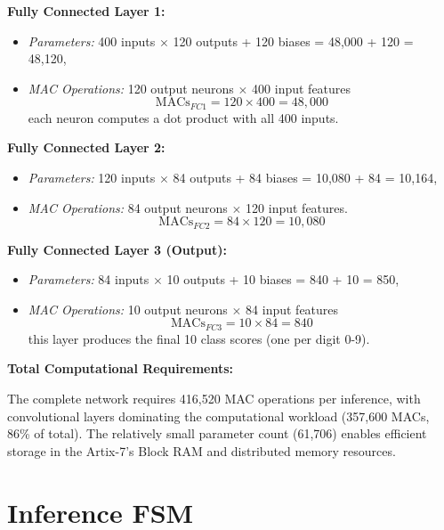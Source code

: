 \documentclass[12pt,a4paper]{report}
\begin{document}
\textbf{Fully Connected Layer 1:}
\begin{itemize}
    \item \textit{Parameters:} 400 inputs $\times$ 120 outputs + 120 biases = 48,000 + 120 = 48,120,
    \item \textit{MAC Operations:} 120 output neurons $\times$ 400 input features
    \begin{equation}
    \text{MACs}_{FC1} = 120 \times 400 = 48,000
    \end{equation}
    each neuron computes a dot product with all 400 inputs.
\end{itemize}

\textbf{Fully Connected Layer 2:}
\begin{itemize}
    \item \textit{Parameters:} 120 inputs $\times$ 84 outputs + 84 biases = 10,080 + 84 = 10,164,
    \item \textit{MAC Operations:} 84 output neurons $\times$ 120 input features.
    \begin{equation}
    \text{MACs}_{FC2} = 84 \times 120 = 10,080
    \end{equation}
\end{itemize}

\textbf{Fully Connected Layer 3 (Output):}
\begin{itemize}
    \item \textit{Parameters:} 84 inputs $\times$ 10 outputs + 10 biases = 840 + 10 = 850,
    \item \textit{MAC Operations:} 10 output neurons $\times$ 84 input features
    \begin{equation}
    \text{MACs}_{FC3} = 10 \times 84 = 840
    \end{equation}
    this layer produces the final 10 class scores (one per digit 0-9).
\end{itemize}

\textbf{Total Computational Requirements:}

The complete network requires 416,520 MAC operations per inference, with convolutional layers dominating the computational workload (357,600 MACs, 86\% of total). The relatively small parameter count (61,706) enables efficient storage in the Artix-7's Block RAM and distributed memory resources.

\section{Inference FSM}
\end{document}
